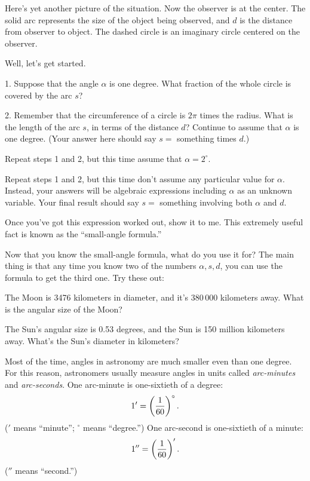 \medskip
{}
\medskip

Here's yet another picture of the situation.  Now the observer is at
the center.  The solid arc represents the size of the object being observed,
and $d$ is the distance from observer to object.  The dashed circle
is an imaginary circle centered on the observer.

\medskip
\centerline{\epsfxsize 2.5in}
\medskip

Well, let's get started.



1. Suppose that the angle $\alpha$ is one degree.  What fraction
of the whole circle is covered by the arc $s$?

\vskip 1in

2. Remember that the circumference of a circle is $2\pi$ times the
radius.  What is the length of the arc $s$, in terms of the distance
$d$?  Continue to assume that $\alpha$ is one degree.
(Your answer here should say $s=$ something times $d$.)


\vskip 1in


Repeat steps 1 and 2, but this time assume that $\alpha=2^\circ$.


\vskip 1.5in

Repeat steps 1 and 2, but this time don't assume any particular
value for $\alpha$.  Instead, your answers will be algebraic
expressions including $\alpha$ as an unknown variable.
Your final result should say $s=$ something involving both $\alpha$ and $d$.


\vskip 2in

Once you've got this expression worked out, show it to me.  This
extremely useful fact is known as the ``small-angle formula.''

Now that you know the small-angle formula, what do you use it for?
The main thing is that any time you know two of the numbers $\alpha,s,d$,
you can use the formula to get the third one.  Try these out:

The Moon is 3476 kilometers in diameter, and it's 380\,000 kilometers
away.  What is the angular size of the Moon?

\vskip 1in

The Sun's angular size is 0.53 degrees, and the Sun is 150 million
kilometers away.  What's the Sun's diameter in kilometers?

\vskip 1in

Most of the time, angles in astronomy are much smaller even than one degree.
For this reason, astronomers usually measure angles in units called
{\it arc-minutes} and {\it arc-seconds}.  One arc-minute is one-sixtieth
of a degree:
$$
1' = \left({1\over 60}\right)^\circ.
$$
($'$ means ``minute''; $^\circ$ means ``degree.'')
One arc-second is one-sixtieth of a minute:
$$
1''=\left({1\over 60}\right)'.
$$
($''$ means ``second.'')

